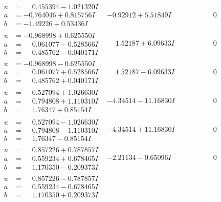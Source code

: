 \documentclass[1p]{elsarticle_modified}
\theoremstyle{definition}
\begin{document}
$$\begin{array}{c|c|c}
\begin{aligned}
u &= \phantom{-}0.455394 - 1.021320 I \\
a &= -0.764046 + 0.815756 I \\
b &= -1.49226 + 0.53436 I\end{aligned}
 & -0.92912 + 5.51849 I & \phantom{-0.000000 } 0 \\ \hline\begin{aligned}
u &= -0.968998 + 0.625550 I \\
a &= \phantom{-}0.061077 - 0.528566 I \\
b &= \phantom{-}0.485762 - 0.040171 I\end{aligned}
 & \phantom{-}1.52187 + 6.09633 I & \phantom{-0.000000 } 0 \\ \hline\begin{aligned}
u &= -0.968998 - 0.625550 I \\
a &= \phantom{-}0.061077 + 0.528566 I \\
b &= \phantom{-}0.485762 + 0.040171 I\end{aligned}
 & \phantom{-}1.52187 - 6.09633 I & \phantom{-0.000000 } 0 \\ \hline\begin{aligned}
u &= \phantom{-}0.527094 + 1.026630 I \\
a &= \phantom{-}0.794808 + 1.110310 I \\
b &= \phantom{-}1.76347 + 0.85154 I\end{aligned}
 & -4.34514 - 11.16830 I & \phantom{-0.000000 } 0 \\ \hline\begin{aligned}
u &= \phantom{-}0.527094 - 1.026630 I \\
a &= \phantom{-}0.794808 - 1.110310 I \\
b &= \phantom{-}1.76347 - 0.85154 I\end{aligned}
 & -4.34514 + 11.16830 I & \phantom{-0.000000 } 0 \\ \hline\begin{aligned}
u &= \phantom{-}0.857226 + 0.787857 I \\
a &= \phantom{-}0.559234 + 0.678465 I \\
b &= \phantom{-}1.170350 - 0.209373 I\end{aligned}
 & -2.21134 - 0.65096 I & \phantom{-0.000000 } 0 \\ \hline\begin{aligned}
u &= \phantom{-}0.857226 - 0.787857 I \\
a &= \phantom{-}0.559234 - 0.678465 I \\
b &= \phantom{-}1.170350 + 0.209373 I\end{aligned}

\end{array}$$
\end{document}
